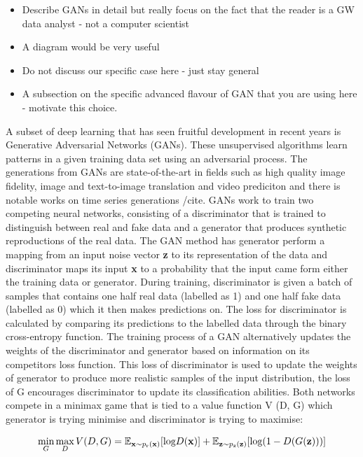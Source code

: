 \documentclass[12pt]{iopart}
\begin{document}
\begin{itemize}
\item Describe GANs in detail but really focus on the fact that the reader is a
GW data analyst - not a computer scientist 
\item A diagram would be very useful 
\item Do not discuss our specific case here - just stay general 
\item A subsection on the specific advanced flavour of GAN that you are using
here - motivate this choice. 
\end{itemize}

A subset of deep learning that has seen fruitful development in recent years \cite{} is Generative Adversarial Networks (GANs). These unsupervised algorithms learn patterns in a given training data set using an adversarial process. The generations from GANs are state-of-the-art in fields such as high quality image fidelity, image and text-to-image translation and video prediciton \cite{} and there is notable works on time series generations /cite. 
GANs work to train two competing neural networks, consisting of a discriminator  that is trained to distinguish
between real and fake data and a generator that produces synthetic
reproductions of the real data. The GAN method has generator perform a mapping
from an input noise vector \textbf{z} to its representation of the data and discriminator  maps its
input \textbf{x} to a probability that the input came form either the training
data or generator.  During training, discriminator  is given a batch of samples that contains one half real data (labelled as 1)
and one half fake data (labelled as 0) which it then makes predictions on. The
loss for discriminator  is calculated by comparing its predictions to the labelled data through the binary cross-entropy function. The training process
of a GAN alternatively updates the weights of the discriminator  and generator based on information
on its competitors loss function. This loss of discriminator  is used to update the weights
of generator to produce more realistic samples of the input distribution, the loss of G
encourages discriminator  to update its classification abilities. Both networks compete
in a minimax game that is tied to a value function V (D, G) which generator is trying
minimise and discriminator  is trying to maximise:

\begin{equation}
\mathop{\text{min}}_{G}  \mathop{\text{max}}_{D} V(D,G) = \mathbb{E}_{\bold{x} \sim p_{\text{r}}(\bold{x})} [\text{log} D(\bold{x})] \\ + \mathbb{E}_{\bold{z} \sim p_{\text{z}}(\bold{z})} [\text{log}(1-D(G(\bold{z})))]
\label{equation:GANloss}
\end{equation}
\end{document}
